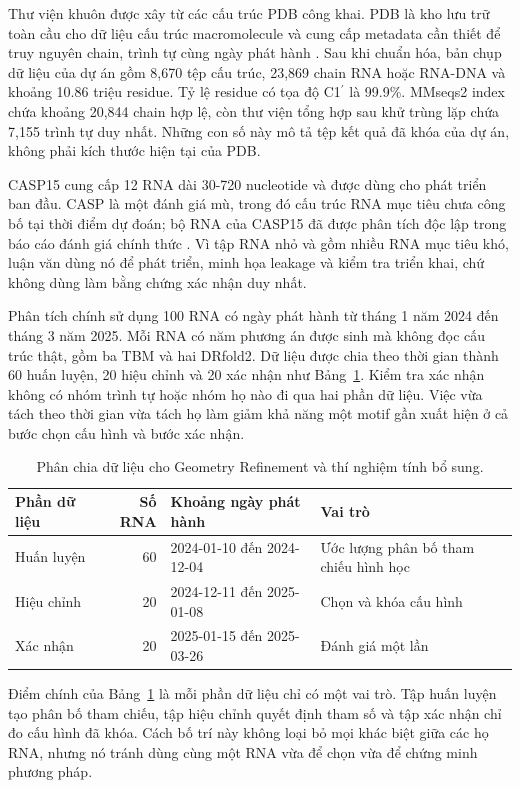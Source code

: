 \documentclass[12pt,a4paper,oneside]{report}
\newcommand{\cprime}{C1$^{\prime}$}
\begin{document}
Thư viện khuôn được xây từ các cấu trúc PDB công khai. PDB là kho lưu trữ toàn cầu
cho dữ liệu cấu trúc macromolecule và cung cấp metadata cần thiết để truy nguyên chain,
trình tự cùng ngày phát hành \cite{pdb_archive}. Sau khi chuẩn hóa, bản chụp dữ liệu của dự án
gồm 8,670 tệp cấu trúc, 23,869 chain RNA hoặc RNA-DNA và khoảng 10.86 triệu residue.
Tỷ lệ residue có tọa độ \cprime{} là 99.9\%. MMseqs2 index chứa khoảng 20,844 chain hợp
lệ, còn thư viện tổng hợp sau khử trùng lặp chứa 7,155 trình tự duy nhất. Những con số
này mô tả tệp kết quả đã khóa của dự án, không phải kích thước hiện tại của PDB.

CASP15 cung cấp 12 RNA dài 30-720 nucleotide và được dùng cho phát triển ban đầu.
CASP là một đánh giá mù, trong đó cấu trúc RNA mục tiêu chưa công bố tại thời điểm dự đoán;
bộ RNA của CASP15 đã được phân tích độc lập trong báo cáo đánh giá chính thức
\cite{casp15}. Vì tập RNA nhỏ và gồm nhiều RNA mục tiêu khó, luận văn dùng nó để phát triển,
minh họa leakage và kiểm tra triển khai, chứ không dùng làm bằng chứng xác nhận duy
nhất.

Phân tích chính sử dụng 100 RNA có ngày phát hành từ tháng 1 năm 2024 đến tháng 3 năm
2025. Mỗi RNA có năm phương án được sinh mà không đọc cấu trúc thật, gồm ba TBM và hai
DRfold2. Dữ liệu được
chia theo thời gian thành 60 huấn luyện, 20 hiệu chỉnh và 20 xác nhận như
Bảng~\ref{tab:splits_vi}. Kiểm tra xác nhận không có nhóm trình tự hoặc nhóm họ nào
đi qua hai phần dữ liệu. Việc vừa tách theo thời gian vừa tách họ làm giảm khả năng một motif
gần xuất hiện ở cả bước chọn cấu hình và bước xác nhận.

\begin{table}[H]
\centering
\caption{Phân chia dữ liệu cho Geometry Refinement và thí nghiệm tính bổ sung.}
\label{tab:splits_vi}
\begin{tabularx}{\textwidth}{l r p{4.2cm} X}
\toprule
Phần dữ liệu & Số RNA & Khoảng ngày phát hành & Vai trò \\
\midrule
Huấn luyện & 60 & 2024-01-10 đến 2024-12-04 & Ước lượng phân bố tham chiếu hình học \\
Hiệu chỉnh & 20 & 2024-12-11 đến 2025-01-08 & Chọn và khóa cấu hình \\
Xác nhận & 20 & 2025-01-15 đến 2025-03-26 & Đánh giá một lần \\
\bottomrule
\end{tabularx}
\end{table}

Điểm chính của Bảng~\ref{tab:splits_vi} là mỗi phần dữ liệu chỉ có một vai trò. Tập huấn luyện
tạo phân bố tham chiếu, tập hiệu chỉnh quyết định tham số và tập xác nhận chỉ đo cấu hình đã khóa.
Cách bố trí này không loại bỏ mọi khác biệt giữa các họ RNA, nhưng nó tránh dùng cùng
một RNA vừa để chọn vừa để chứng minh phương pháp.
\end{document}
